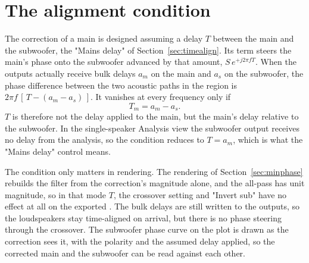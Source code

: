 \section{The alignment condition}
The correction of a main is designed assuming a delay $T$ between the main and the subwoofer, the "Mains delay" of Section~\ref{sec:timealign}. Its  term steers the main's phase onto the subwoofer advanced by that amount, $S\,e^{+j2\pi fT}$. When the outputs actually receive bulk delays $a_m$ on the main and $a_s$ on the subwoofer, the phase difference between the two acoustic paths in the  region is $2\pi f\,[\,T - (a_m - a_s)\,]$. It vanishes at every frequency only if
\begin{equation}
  T_m = a_m - a_s .
  \label{eq:dlyidentity}
\end{equation}
$T$ is therefore not the delay applied to the main, but the main's delay relative to the subwoofer. In the single-speaker Analysis view the subwoofer output receives no delay from the analysis, so the condition reduces to $T = a_m$, which is what the "Mains delay" control means.

The condition only matters in  rendering. The  rendering of Section~\ref{sec:minphase} rebuilds the filter from the correction's magnitude alone, and the all-pass has unit magnitude, so in that mode $T$, the crossover setting and "Invert sub" have no effect at all on the exported . The bulk delays are still written to the outputs, so the loudspeakers stay time-aligned on arrival, but there is no phase steering through the crossover. The subwoofer phase curve on the plot is drawn as the correction sees it, with the polarity and the assumed delay applied, so the corrected main and the subwoofer can be read against each other.

